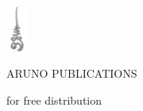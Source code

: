 \documentclass[11pt,oneside,final]{memoir}
\begin{document}
\centering

\mbox{}\vfill

\includegraphics[height=15mm,keepaspectratio]{buddho.jpg}
\vspace*{3mm}

ARUNO PUBLICATIONS
\vspace*{4mm}

for free distribution
\vspace*{9mm}
\end{document}
